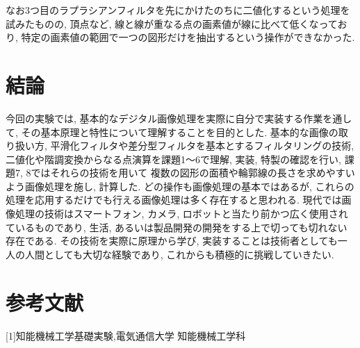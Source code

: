 \documentclass[a4paper,11pt,uplatex, titlepage]{jsarticle}
\begin{document}
なお3つ目のラプラシアンフィルタを先にかけたのちに二値化するという処理を試みたものの, 頂点など, 線と線が重なる点の画素値が線に比べて低くなっており,
特定の画素値の範囲で一つの図形だけを抽出するという操作ができなかった.

\section{結論}
今回の実験では, 基本的なデジタル画像処理を実際に自分で実装する作業を通して, その基本原理と特性について理解することを目的とした.
基本的な画像の取り扱い方, 平滑化フィルタや差分型フィルタを基本とするフィルタリングの技術, 二値化や階調変換からなる点演算を課題1〜6で理解, 実装, 特製の確認を行い, 課題7, 8ではそれらの技術を用いて
複数の図形の面積や輪郭線の長さを求めやすいよう画像処理を施し, 計算した. どの操作も画像処理の基本ではあるが, これらの処理を応用するだけでも行える画像処理は多く存在すると思われる. 現代では画像処理の技術はスマートフォン, カメラ, ロボットと当たり前かつ広く使用されているものであり,
生活, あるいは製品開発の開発をする上で切っても切れない存在である. その技術を実際に原理から学び, 実装することは技術者としても一人の人間としても大切な経験であり, これからも積極的に挑戦していきたい.
\section{参考文献}
[1]知能機械工学基礎実験,電気通信大学  知能機械工学科
\end{document}
